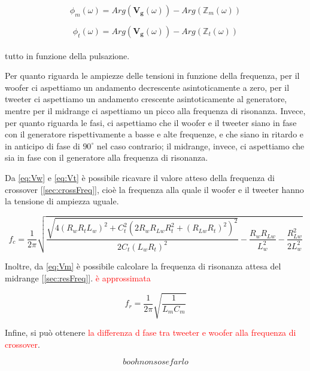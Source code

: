 \documentclass[12pt,italian]{article}
\newcommand{\err}[1]{\textcolor{red}{#1}}
\begin{document}
\begin{equation}
	\phi_{m}(\omega) = Arg(\mathbf{V_{g}}(\omega)) - Arg(\mathbb{Z}_{m}(\omega))
\end{equation}

\begin{equation}
	\phi_{t}(\omega) =  Arg(\mathbf{V_{g}}(\omega)) - Arg(\mathbb{Z}_{t}(\omega))
\end{equation}
\\
tutto in funzione della pulsazione.

Per quanto riguarda le ampiezze delle tensioni in funzione della frequenza, per
il woofer ci aspettiamo un andamento decrescente asintoticamente a zero, per il
tweeter ci aspettiamo un andamento crescente asintoticamente al generatore,
mentre per il midrange ci aspettiamo un picco alla frequenza di risonanza.
Invece, per quanto riguarda le fasi, ci aspettiamo che il woofer e il tweeter
siano in fase con il generatore rispettivamente a basse e alte frequenze, e che
siano in ritardo e in anticipo di fase di $90^\circ$ nel caso contrario; il
midrange, invece, ci aspettiamo che sia in fase con il generatore alla
frequenza di risonanza.

Da \eqref{eq:Vw} e \eqref{eq:Vt} è possibile ricavare il valore atteso della
frequenza di crossover [\ref{sec:crossFreq}], cioè la frequenza alla quale il
woofer e il tweeter hanno la tensione di ampiezza uguale.

\begin{equation}
	f_{c} = \frac{1}{2\pi}\sqrt{\frac{\sqrt{4 (R_{w} R_{t} L_{w})^2 + C_{t}^2(2
				R_{w} R_{Lw} R_{t}^2 + (R_{Lw} R_{t})^2)^2}}{2 C _{t} (L_{w} R_{t})^2 } -
		\frac{R_{w} R_{Lw}}{L_{w}^2} - \frac{R_{Lw}^2}{2 L_{w}^2}}
	\label{eq:fc}
\end{equation}

\noindent
Inoltre, da \eqref{eq:Vm} è possibile calcolare la frequenza di risonanza attesa del midrange [\ref{sec:resFreq}].
\err{è approssimata}

\begin{equation}
	f_{r} = \frac{1}{2\pi}\sqrt{\frac{1}{L_{m} C_{m}}}  %
	\label{eq:fr}
\end{equation}

\noindent
Infine, si può ottenere \err{la differenza d fase tra tweeter e woofer alla frequenza di crossover}.

\begin{equation}
	booh non so se farlo
\end{equation}
\end{document}
